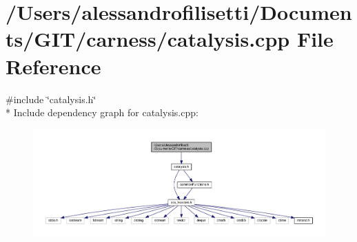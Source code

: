 \hypertarget{a00073}{\section{/\-Users/alessandrofilisetti/\-Documents/\-G\-I\-T/carness/catalysis.cpp File Reference}
\label{a00073}
}
{\ttfamily \#include \char`\"{}catalysis.\-h\char`\"{}}\\*
Include dependency graph for catalysis.\-cpp\-:\nopagebreak
\begin{figure}[H]
\begin{center}
\leavevmode
\includegraphics[width=350pt]{a00126}
\end{center}
\end{figure}
